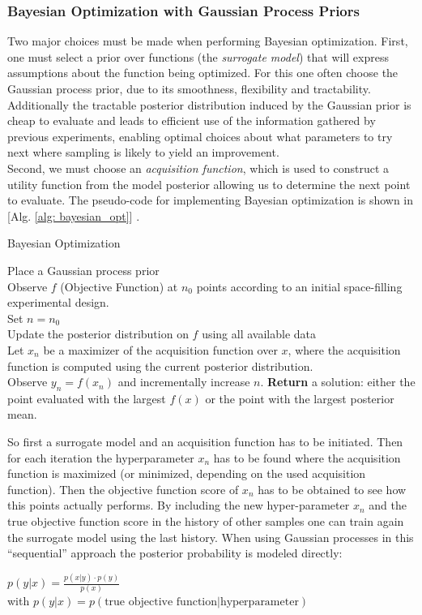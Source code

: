 \documentclass[12pt, a4paper]{article}
\begin{document}
\subsubsection{Bayesian Optimization with Gaussian Process Priors}
Two major choices must be made when performing Bayesian optimization. First, one must select a prior over functions (the \textit{surrogate model}) that will express assumptions about the function being optimized. For this one often choose the Gaussian process prior, due to its smoothness, flexibility and tractability. Additionally the tractable posterior distribution induced by the Gaussian prior is cheap to evaluate and leads to efficient use of the information gathered by previous experiments, enabling optimal choices about what parameters to try next \cite{Snoek2012} where sampling is likely to yield an improvement. \\
Second, we must choose an \textit{acquisition function}, which is used to construct a utility function from the model posterior allowing us to determine the next point to evaluate. The pseudo-code for implementing Bayesian optimization is shown in [Alg. \ref{alg: bayesian_opt}] \cite{Frazier2018}.
\begin{algorithm}
\caption{Bayesian Optimization \cite{Frazier2018}}
    \label{alg: bayesian_opt}
    Place a Gaussian process prior \\
    Observe $f$ (Objective Function) at $n_0$ points according to an initial space-filling experimental design. \\
    Set $n = n_0$ \\
    {
    Update the posterior distribution on $f$ using all available data \\
    Let $x_n$ be a maximizer of the acquisition function over $x$, where the acquisition function is computed using the current posterior distribution.\\
    Observe $y_n = f(x_n)$ and incrementally increase $n$.
    }
    \textbf{Return} a solution: either the point evaluated with the largest $f(x)$ or the point with the largest posterior mean.
\end{algorithm}
\newpage
So first a surrogate model and an acquisition function has to be initiated. Then for each iteration the hyperparameter $x_n$ has to be found where the acquisition function is maximized (or minimized, depending on the used acquisition function). Then the objective function score of $x_n$ has to be obtained to see how this points actually performs. By including the new hyper-parameter $x_n$ and the true objective function score in the history of other samples one can train again the surrogate model using the last history.
When using Gaussian processes in this ``sequential'' approach the posterior probability is modeled directly:
\begin{center}
    $p(y|x) = \frac{p(x|y) \cdot p(y)}{p(x)}$ \\
    with $ p(y|x) = p(\text{true objective function} | \text{hyperparameter})$
\end{center}
\end{document}
